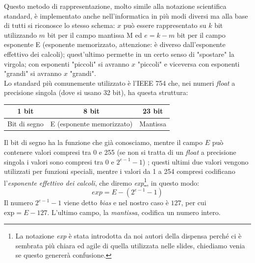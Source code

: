 \documentclass[class=book, crop=false, oneside]{standalone}
\begin{document}
Questo metodo di rappresentazione, molto simile alla notazione scientifica standard, è implementato anche nell'informatica in più modi diversi ma alla base di tutti si riconosce lo stesso schema: \(x\) può essere rappresentato su \(k\) bit utilizzando \(m\) bit per il campo mantissa M ed \(e=k-m\) bit per il campo esponente E (esponente memorizzato, attenzione: è diverso dall'esponente effettivo dei calcoli); quest'ultimo permette in un certo senso di "spostare" la virgola; con esponenti "piccoli" si avranno \(x\) "piccoli" e viceversa con esponenti "grandi" si avranno \(x\) "grandi".\\
Lo standard più comunemente utilizzato è l'IEEE 754 che, nei numeri \emph{float} a precisione singola (dove si usano 32 bit), ha questa struttura:
\begin{table}[h!]
	\centering
	\begin{tabular}{|l|l|l|}
		\hline
		\multicolumn{1}{|c|}{1 bit} & \multicolumn{1}{c|}{8 bit} & \multicolumn{1}{c|}{23 bit} \\ \hline
		Bit di segno                & E (esponente memorizzato)    & Mantissa                    \\ \hline
	\end{tabular}
\end{table}


Il bit di segno ha la funzione che già conosciamo, mentre il campo \(E\) può contenere valori compresi tra 0 e 255 (se non si tratta di un \emph{float} a precisione singola i valori sono compresi tra 0 e \(2^{e-1}-1\))%
; questi ultimi due valori vengono utilizzati per funzioni speciali, mentre i valori da 1 a 254 compresi codificano l'\emph{esponente effettivo dei calcoli}, che diremo \emph{exp}\footnote{La notazione \emph{exp} è stata introdotta da noi autori della dispensa perché ci è sembrata più chiara ed agile di quella utilizzata nelle slides, chiediamo venia se questo genererà confusione.}, in questo modo:
\begin{equation*}
	exp=E-(2^{e-1}-1)
\end{equation*}
Il numero \(2^{e-1}-1\) viene detto \emph{bias} e nel nostro caso è \(127\), per cui \(\textrm{exp}=E-127\). L'ultimo campo, la \emph{mantissa}, codifica un numero intero.
\end{document}
